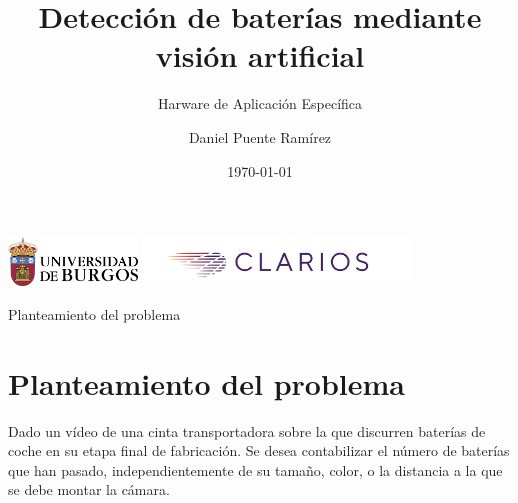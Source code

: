 \documentclass{beamer}
\author[Daniel Puente Ramírez]{Daniel Puente Ramírez}
\institute[]{Universidad de Burgos}
\title[Detección de baterías]{Detección de baterías mediante visión artificial}
\subtitle{Harware de Aplicación Específica}
\date{\today}
\begin{document}
\begin{frame}
	\titlepage
	\begin{center}
  		\includegraphics[height=1.3cm]{img/Escudo-Apaisado}
		\includegraphics[height=1.3cm]{img/Clarios}
	\end{center}
\end{frame}



\begin{frame}
\tableofcontents
\end{frame}


\begin{frame}{Planteamiento del problema}
\section{Planteamiento del problema}
Dado un vídeo de una cinta transportadora sobre la que discurren baterías de coche en su etapa final de fabricación. Se desea contabilizar el número de baterías que han pasado, independientemente de su tamaño, color, o la distancia a la que se debe montar la cámara.
\end{frame}
\end{document}
